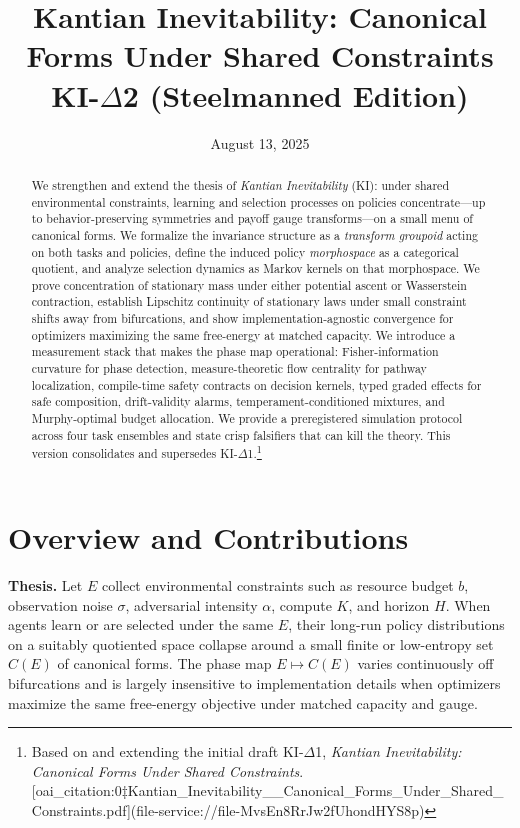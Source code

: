 \documentclass[11pt]{article}
\title{Kantian Inevitability: Canonical Forms Under Shared Constraints\\\large KI-$\Delta$2 (Steelmanned Edition)}
\author{ }
\date{August 13, 2025}
\newcommand{\1}{\mathbbm{1}}
\begin{document}
\maketitle

\begin{abstract}
We strengthen and extend the thesis of \emph{Kantian Inevitability} (KI): under shared environmental constraints, learning and selection processes on policies concentrate---up to behavior-preserving symmetries and payoff gauge transforms---on a small menu of canonical forms. We formalize the invariance structure as a \emph{transform groupoid} acting on both tasks and policies, define the induced policy \emph{morphospace} as a categorical quotient, and analyze selection dynamics as Markov kernels on that morphospace. We prove concentration of stationary mass under either potential ascent or Wasserstein contraction, establish Lipschitz continuity of stationary laws under small constraint shifts away from bifurcations, and show implementation-agnostic convergence for optimizers maximizing the same free-energy at matched capacity. We introduce a measurement stack that makes the phase map operational: Fisher-information curvature for phase detection, measure-theoretic flow centrality for pathway localization, compile-time safety contracts on decision kernels, typed graded effects for safe composition, drift-validity alarms, temperament-conditioned mixtures, and Murphy-optimal budget allocation. We provide a preregistered simulation protocol across four task ensembles and state crisp falsifiers that can kill the theory. This version consolidates and supersedes KI-$\Delta$1.\footnote{Based on and extending the initial draft KI-$\Delta$1, \emph{Kantian Inevitability: Canonical Forms Under Shared Constraints}.  [oai_citation:0‡Kantian_Inevitability__Canonical_Forms_Under_Shared_Constraints.pdf](file-service://file-MvsEn8RrJw2fUhondHYS8p)}
\end{abstract}

\section{Overview and Contributions}
\textbf{Thesis.} Let $E$ collect environmental constraints such as resource budget $b$, observation noise $\sigma$, adversarial intensity $\alpha$, compute $K$, and horizon $H$. When agents learn or are selected under the same $E$, their long-run policy distributions on a suitably quotiented space collapse around a small finite or low-entropy set $C(E)$ of canonical forms. The phase map $E \mapsto C(E)$ varies continuously off bifurcations and is largely insensitive to implementation details when optimizers maximize the same free-energy objective under matched capacity and gauge.
\end{document}
